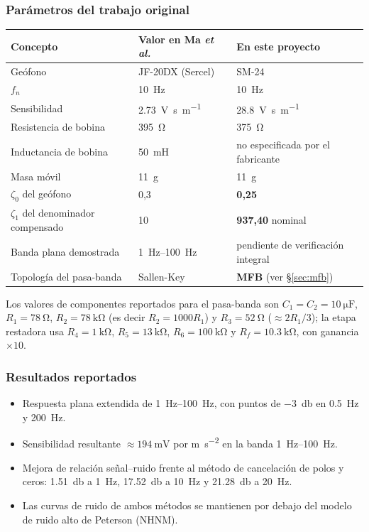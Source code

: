 \subsubsection{Par\'ametros del trabajo original}

\begin{center}\footnotesize
\begin{tabular}{@{}lll@{}}
\toprule
Concepto & Valor en Ma \emph{et al.}~\cite{Ma2023} & En este proyecto \\
\midrule
Ge\'ofono & JF-20DX (Sercel) & SM-24 \\
$f_n$ & \SI{10}{\hertz} & \SI{10}{\hertz} \\
Sensibilidad & \SI{2.73}{\volt\second\per\meter} & \SI{28.8}{\volt\second\per\meter} \\
Resistencia de bobina & \SI{395}{\ohm} & \SI{375}{\ohm} \\
Inductancia de bobina & \SI{50}{\milli\henry} & no especificada por el fabricante \\
Masa m\'ovil & \SI{11}{\gram} & \SI{11}{\gram} \\
$\zeta_0$ del ge\'ofono & 0{,}3 & \textbf{0{,}25} \\
$\zeta_1$ del denominador compensado & 10 & \textbf{937{,}40} nominal \\
Banda plana demostrada & \SIrange{1}{100}{\hertz} & pendiente de verificaci\'on integral \\
Topolog\'ia del pasa-banda & Sallen-Key & \textbf{MFB} (ver \S\ref{sec:mfb}) \\
\bottomrule
\end{tabular}
\end{center}

Los valores de componentes reportados para el pasa-banda son
$C_1=C_2=\SI{10}{\micro\farad}$, $R_1=\SI{78}{\ohm}$, $R_2=\SI{78}{\kilo\ohm}$
(es decir $R_2=1000R_1$) y $R_3=\SI{52}{\ohm}$ ($\approx 2R_1/3$); la etapa restadora usa
$R_4=\SI{1}{\kilo\ohm}$, $R_5=\SI{13}{\kilo\ohm}$, $R_6=\SI{100}{\kilo\ohm}$ y
$R_f=\SI{10.3}{\kilo\ohm}$, con ganancia $\times10$.

\subsubsection{Resultados reportados}

\begin{itemize}[itemsep=0.15em]
    \item Respuesta plana extendida de \SIrange{1}{100}{\hertz}, con puntos de
    \SI{-3}{\decibel} en \SI{0.5}{\hertz} y \SI{200}{\hertz}.
    \item Sensibilidad resultante $\approx\SI{194}{\milli\volt}$ por
    \si{\meter\per\second\squared} en la banda \SIrange{1}{100}{\hertz}.
    \item Mejora de relaci\'on se\~nal--ruido frente al m\'etodo de cancelaci\'on de polos y
    ceros: \SI{+1.51}{\decibel} a \SI{1}{\hertz}, \SI{+17.52}{\decibel} a
    \SI{10}{\hertz} y \SI{+21.28}{\decibel} a \SI{20}{\hertz}.
    \item Las curvas de ruido de ambos m\'etodos se mantienen por debajo del modelo de
    ruido alto de Peterson (NHNM).
\end{itemize}

